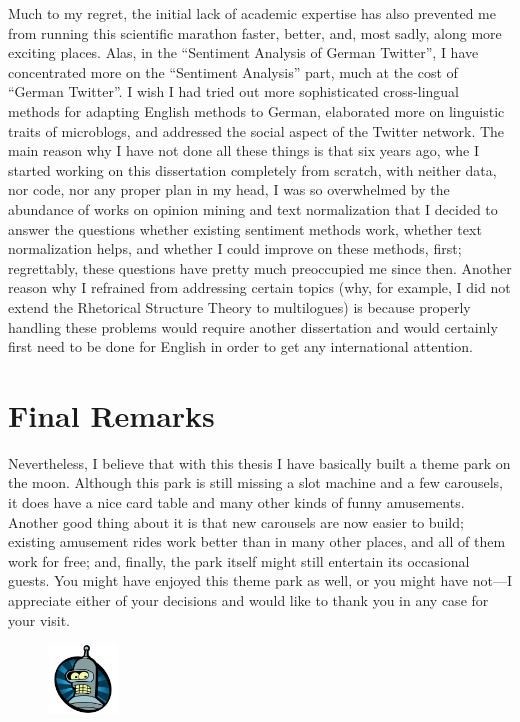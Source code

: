 Much to my regret, the initial lack of academic expertise has also
prevented me from running this scientific marathon faster, better,
and, most sadly, along more exciting places.  Alas, in the ``Sentiment
Analysis of German Twitter'', I have concentrated more on the
``Sentiment Analysis'' part, much at the cost of ``German Twitter''.
I wish I had tried out more sophisticated cross-lingual methods for
adapting English methods to German, elaborated more on linguistic
traits of microblogs, and addressed the social aspect of the Twitter
network.  The main reason why I have not done all these things is that
six years ago, whe I started working on this dissertation completely
from scratch, with neither data, nor code, nor any proper plan in my
head, I was so overwhelmed by the abundance of works on opinion mining
and text normalization that I decided to answer the questions whether
existing sentiment methods work, whether text normalization helps, and
whether I could improve on these methods, first; regrettably, these
questions have pretty much preoccupied me since then.  Another reason
why I refrained from addressing certain topics (why, for example, I
did not extend the Rhetorical Structure Theory to multilogues) is
because properly handling these problems would require another
dissertation and would certainly first need to be done for English in
order to get any international attention.


\section*{Final Remarks}

Nevertheless, I believe that with this thesis I have basically built a
theme park on the moon.  Although this park is still missing a slot
machine and a few carousels, it does have a nice card table and many
other kinds of funny amusements.  Another good thing about it is that
new carousels are now easier to build; existing amusement rides work
better than in many other places, and all of them work for free; and,
finally, the park itself might still entertain its occasional guests.
You might have enjoyed this theme park as well, or you might have
not---I appreciate either of your decisions and would like to thank
you in any case for your visit.
\begin{figure}[htb]
  \centering \includegraphics[height=5em]{img/bender.png}
\end{figure}
